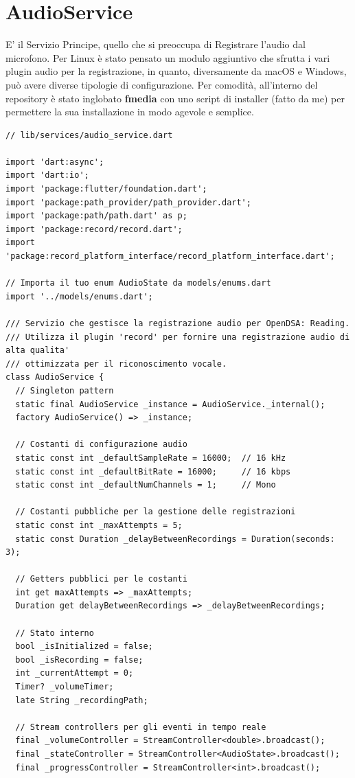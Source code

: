 \documentclass[14pt]{extbook}
\begin{document}
\section{AudioService}
E' il Servizio Principe, quello che si preoccupa di Registrare l'audio dal microfono. Per Linux è stato pensato un modulo aggiuntivo che sfrutta i vari plugin audio per la registrazione, in quanto, diversamente da macOS e Windows, può avere diverse tipologie di configurazione. Per comodità, all'interno del repository è stato inglobato \textbf{fmedia} con uno script di installer (fatto da me) per permettere la sua installazione in modo agevole e semplice.\\
\begin{lstlisting}[caption=audio\_service.dart, label=lst:AudioService]
// lib/services/audio_service.dart

import 'dart:async';
import 'dart:io';
import 'package:flutter/foundation.dart';
import 'package:path_provider/path_provider.dart';
import 'package:path/path.dart' as p;
import 'package:record/record.dart';
import 'package:record_platform_interface/record_platform_interface.dart';

// Importa il tuo enum AudioState da models/enums.dart
import '../models/enums.dart';

/// Servizio che gestisce la registrazione audio per OpenDSA: Reading.
/// Utilizza il plugin 'record' per fornire una registrazione audio di alta qualita'
/// ottimizzata per il riconoscimento vocale.
class AudioService {
  // Singleton pattern
  static final AudioService _instance = AudioService._internal();
  factory AudioService() => _instance;

  // Costanti di configurazione audio
  static const int _defaultSampleRate = 16000;  // 16 kHz
  static const int _defaultBitRate = 16000;     // 16 kbps
  static const int _defaultNumChannels = 1;     // Mono

  // Costanti pubbliche per la gestione delle registrazioni
  static const int _maxAttempts = 5;
  static const Duration _delayBetweenRecordings = Duration(seconds: 3);

  // Getters pubblici per le costanti
  int get maxAttempts => _maxAttempts;
  Duration get delayBetweenRecordings => _delayBetweenRecordings;

  // Stato interno
  bool _isInitialized = false;
  bool _isRecording = false;
  int _currentAttempt = 0;
  Timer? _volumeTimer;
  late String _recordingPath;

  // Stream controllers per gli eventi in tempo reale
  final _volumeController = StreamController<double>.broadcast();
  final _stateController = StreamController<AudioState>.broadcast();
  final _progressController = StreamController<int>.broadcast();


\end{lstlisting}
\end{document}
